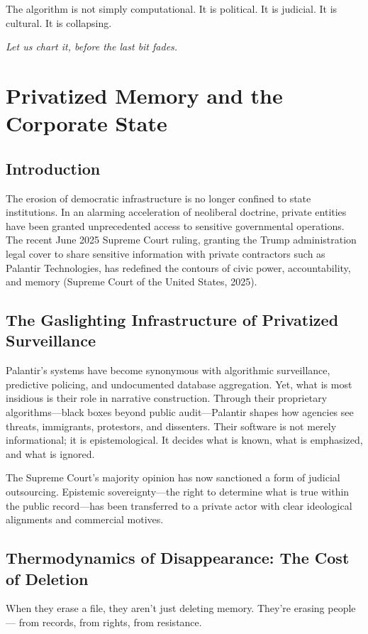 The algorithm is not simply computational. It is political. It is judicial. It is cultural. It is collapsing.

\begin{flushright}
\textit{Let us chart it, before the last bit fades.}
\end{flushright}

\newpage

\chapter{Privatized Memory and the Corporate State}

\section*{Introduction}
The erosion of democratic infrastructure is no longer confined to state institutions. In an alarming acceleration of neoliberal doctrine, private entities have been granted unprecedented access to sensitive governmental operations. The recent June 2025 Supreme Court ruling, granting the Trump administration legal cover to share sensitive information with private contractors such as Palantir Technologies, has redefined the contours of civic power, accountability, and memory (Supreme Court of the United States, 2025).

\section{The Gaslighting Infrastructure of Privatized Surveillance}
Palantir’s systems have become synonymous with algorithmic surveillance, predictive policing, and undocumented database aggregation. Yet, what is most insidious is their role in narrative construction. Through their proprietary algorithms—black boxes beyond public audit—Palantir shapes how agencies see threats, immigrants, protestors, and dissenters. Their software is not merely informational; it is epistemological. It decides what is known, what is emphasized, and what is ignored.

The Supreme Court’s majority opinion has now sanctioned a form of judicial outsourcing. Epistemic sovereignty—the right to determine what is true within the public record—has been transferred to a private actor with clear ideological alignments and commercial motives.

\section{Thermodynamics of Disappearance: The Cost of Deletion}
When they erase a file, they aren’t just deleting memory. They’re erasing people — from records, from rights, from resistance.  

